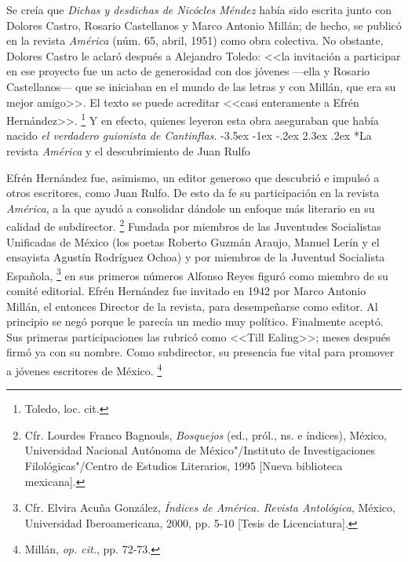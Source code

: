 \documentclass[14pt,twoside,final]{extbook} %
\makeatletter
\let\oldfootnote\footnote
\renewcommand\footnote[1]{%
\oldfootnote{\hspace{1mm}#1}}
\renewcommand\section{\@startsection {section}{1}{\z@}%
                                     {-3.5ex \@plus -1ex \@minus -.2ex}%
                                     {2.3ex \@plus .2ex}%
                                     {\normalfont\large\bfseries\sc}}
\makeatother
\begin{document}
Se creía que \emph{Dichas y desdichas de Nicócles Méndez} había sido escrita junto con Dolores Castro, Rosario Castellanos y Marco Antonio Millán; de hecho, se publicó en la revista \emph{América} (núm. 65, abril, 1951) como obra colectiva. No obstante, Dolores Castro le aclaró después a Alejandro Toledo: <<la invitación a participar en ese proyecto fue un acto de generosidad con dos jóvenes ---ella y Rosario Castellanos--- que se iniciaban en el mundo de las letras y con Millán, que era su mejor amigo>>. El texto se puede acreditar <<casi enteramente a Efrén Hernández>>.\footnote{Toledo, loc. cit.} Y en efecto, quienes leyeron esta obra aseguraban que había nacido \emph{el verdadero guionista de Cantinflas}.
\section*{La revista \emph{América} y el descubrimiento de Juan Rulfo}\label{sec:La-revista-américa-y-el-descubrimiento-de-juan-rulfo}
Efrén Hernández fue, asimismo, un editor generoso que descubrió e impulsó a otros escritores, como Juan Rulfo. De esto da fe su participación en la revista \emph{América}, a la que ayudó a consolidar dándole un enfoque más literario en su calidad de subdirector.\footnote{Cfr. Lourdes Franco Bagnouls, \emph{Bosquejos} (ed., pról., ns. e índices), México, Universidad Nacional Autónoma de México"/Instituto de Investigaciones Filológicas"/Centro de Estudios Literarios, 1995 [Nueva biblioteca mexicana].} Fundada por miembros de las Juventudes Socialistas Unificadas de México (los poetas Roberto Guzmán Araujo, Manuel Lerín y el ensayista Agustín Rodríguez Ochoa) y por miembros de la Juventud Socialista Española,\footnote{Cfr. Elvira Acuña González, \emph{Índices de \emph{América}. Revista Antológica}, México, Universidad Iberoamericana, 2000, pp. 5-10 [Tesis de Licenciatura].} en sus primeros números Alfonso Reyes figuró como miembro de su comité editorial. Efrén Hernández fue invitado en 1942 por Marco Antonio Millán, el entonces Director de la revista, para desempeñarse como editor. Al principio se negó porque le parecía un medio muy político. Finalmente aceptó. Sus primeras participaciones las rubricó como <<Till Ealing>>; meses después firmó ya con su nombre. Como subdirector, su presencia fue vital para promover a jóvenes escritores de México.\footnote{Millán, \emph{op. cit.}, pp. 72-73.}
\end{document}
